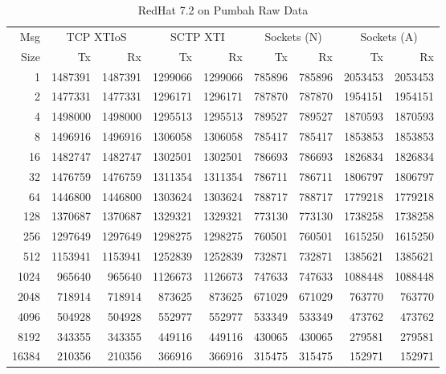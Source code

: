 \documentclass[letterpaper,final,notitlepage,twocolumn,10pt,twoside]{article}
\let\normalsize = \small
\let\small = \footnotesize
\let\footnotesize = \scriptsize
\let\scriptsize = \tiny
\begin{document}
\begin{appendix}
\begin{table}[hbp]
\footnotesize
\begin{center}
\setlength{\tabcolsep}{0.2em}
\setlength{\arraycolsep}{0.2em}
\begin{tabular}{rrrrrrrrr}\\
Msg & \multicolumn{2}{c}{TCP XTIoS} & \multicolumn{2}{c}{SCTP XTI} & \multicolumn{2}{c}{Sockets (N)} & \multicolumn{2}{c}{Sockets (A)}\\
Size & Tx & Rx & Tx & Rx & Tx & Rx & Tx & Rx\\
\hline
\hline
1 & 1487391 & 1487391 & 1299066 & 1299066 & 785896 & 785896 & 2053453 & 2053453\\
2 & 1477331 & 1477331 & 1296171 & 1296171 & 787870 & 787870 & 1954151 & 1954151\\
4 & 1498000 & 1498000 & 1295513 & 1295513 & 789527 & 789527 & 1870593 & 1870593\\
8 & 1496916 & 1496916 & 1306058 & 1306058 & 785417 & 785417 & 1853853 & 1853853\\
16 & 1482747 & 1482747 & 1302501 & 1302501 & 786693 & 786693 & 1826834 & 1826834\\
32 & 1476759 & 1476759 & 1311354 & 1311354 & 786711 & 786711 & 1806797 & 1806797\\
64 & 1446800 & 1446800 & 1303624 & 1303624 & 788717 & 788717 & 1779218 & 1779218\\
128 & 1370687 & 1370687 & 1329321 & 1329321 & 773130 & 773130 & 1738258 & 1738258\\
256 & 1297649 & 1297649 & 1298275 & 1298275 & 760501 & 760501 & 1615250 & 1615250\\
512 & 1153941 & 1153941 & 1252839 & 1252839 & 732871 & 732871 & 1385621 & 1385621\\
1024 & 965640 & 965640 & 1126673 & 1126673 & 747633 & 747633 & 1088448 & 1088448\\
2048 & 718914 & 718914 & 873625 & 873625 & 671029 & 671029 & 763770 & 763770\\
4096 & 504928 & 504928 & 552977 & 552977 & 533349 & 533349 & 473762 & 473762\\
8192 & 343355 & 343355 & 449116 & 449116 & 430065 & 430065 & 279581 & 279581\\
16384 & 210356 & 210356 & 366916 & 366916 & 315475 & 315475 & 152971 & 152971\\
\hline
\end{tabular}
\end{center}
\normalsize
\caption[RedHat 7.2 on Pumbah Raw Data]{RedHat 7.2 on Pumbah Raw Data}
\label{table:rh72data}
\end{table}


\end{appendix}
\end{document}
